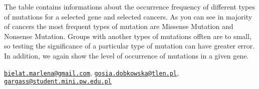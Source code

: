 The table contains informations about the occurrence frequency of
different types of mutations for a selected gene and selected cancers.
As you can see in majority of cancers the most frequent types of
mutation are Missense Mutation and Nonsense Mutation. Groups with
another types of mutations offten are to small, so testing the
significance of a particular type of mutation can have greater error. In
addition, we again show the level of occurrence of mutations in a given
gene.

\citep{R}



\address{%
Marlena Bielat, Małgorzata Dobkowska, Sebastian Gargas\\
MiNI Warsaw University of Technology\\
\\
}
\href{mailto:bielat.marlena@gmail.com}{\nolinkurl{bielat.marlena@gmail.com}},
\href{mailto:gosia.dobkowska@tlen.pl}{\nolinkurl{gosia.dobkowska@tlen.pl}},
\href{mailto:gargass@student.mini.pw.edu.pl}{\nolinkurl{gargass@student.mini.pw.edu.pl}}

